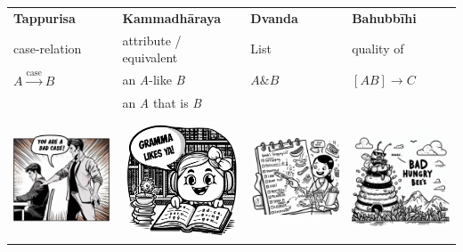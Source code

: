 \documentclass[11pt,oneside]{memoir}
\begin{document}
\begin{longtable}{L{4cm} L{4cm} L{4cm} L{4cm}}
\textbf{Tappurisa} & \textbf{Kammadhāraya} & \textbf{Dvanda} & \textbf{Bahubbīhi}\\[0pt]
case-relation & attribute / equivalent & List & quality of\\[0pt]
\(A \xrightarrow{\text{case}} B\) & an \emph{A}-like \emph{B} & \(A \mathbin{\&} B\) & \([A B] \rightarrow C\)\\[0pt]
 & an \emph{A} that is \emph{B} &  & \\[0pt]
 &  &  & \\[0pt]
\includegraphics[width=4cm]{./images/tapping-bad-case.jpeg} & \includegraphics[width=4cm]{./images/gramma-likes-ya.jpeg} & \includegraphics[width=4cm]{./images/vandas-shopping-list.jpeg} & \includegraphics[width=4cm]{./images/bad-hungry-bees-hive.jpeg}\\[0pt]

\end{longtable}
\end{document}
